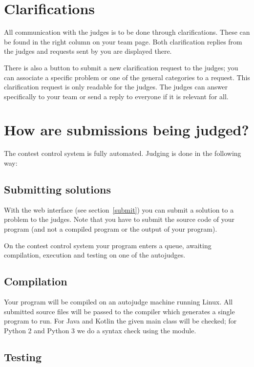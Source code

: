 \section{Clarifications}

All communication with the judges is to be done through clarifications.
These can be found in the right column on your team page. Both
clarification replies from the judges and requests sent by you
are displayed there.

There is also a button to submit a new clarification request to the
judges; you can associate a specific problem or one of the general
categories to a request. This clarification request is only readable
for the judges. The judges can answer specifically to your team or send a
reply to everyone if it is relevant for all.

\section{How are submissions being judged?}\label{howjudged}

The \DOMjudge contest control system is fully automated.
Judging is done in the following way:

\subsection{Submitting solutions}

With%
the web interface (see section~\ref{submit}) you can submit a solution
to a problem to the judges. Note that you have to submit the source code
of your program (and not a compiled program or the output of your
program).

On the contest control system your program enters a queue, awaiting compilation,
execution and testing on one of the autojudges.

\subsection{Compilation}

Your program will be compiled on an autojudge machine running Linux.
All submitted source files will be passed to the compiler which
generates a single program to run. For Java and Kotlin the given
main class will be checked; for Python 2 and Python 3 we do a
syntax check using the  module.

\subsection{Testing}\label{testing}

